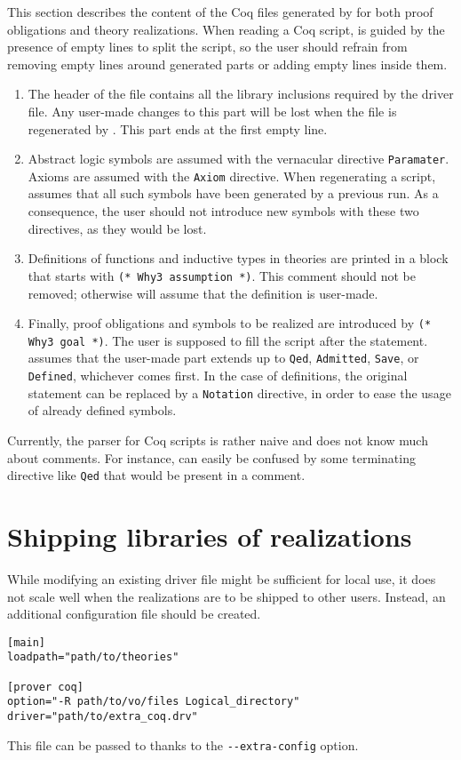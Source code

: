 This section describes the content of the Coq files generated by \why for
both proof obligations and theory realizations. When reading a Coq
script, \why is guided by the presence of empty lines to split the
script, so the user should refrain from removing empty lines around
generated parts or adding empty lines inside them.

\begin{enumerate}
\item	The header of the file contains all the library inclusions
	required by the driver file. Any user-made changes to this part
	will be lost when the file is regenerated by \why. This part ends
	at the first empty line.
\item	Abstract logic symbols are assumed with the vernacular directive
	\verb+Paramater+. Axioms are assumed with the \verb+Axiom+
	directive. When regenerating a script, \why assumes that all such
	symbols have been generated by a previous run. As a consequence,
	the user should not introduce new symbols with these two
	directives, as they would be lost.
\item	Definitions of functions and inductive types in theories are
	printed in a block that starts with \verb+(* Why3 assumption *)+.
	This comment should not be removed; otherwise \why will assume
	that the definition is user-made.
\item	Finally, proof obligations and symbols to be realized are
	introduced by \verb+(* Why3 goal *)+. The user is supposed to
	fill the script after the statement. \why assumes that the
	user-made part extends up to \verb+Qed+, \verb+Admitted+,
	\verb+Save+, or \verb+Defined+, whichever comes first. In the
	case of definitions, the original statement can be replaced by
	a \verb+Notation+ directive, in order to ease the usage of
	already defined symbols.
\end{enumerate}

Currently, the parser for Coq scripts is rather naive and does not know
much about comments. For instance, \why can easily be confused by
some terminating directive like \verb+Qed+ that would be present in a
comment.

\section{Shipping libraries of realizations}

While modifying an existing driver file might be sufficient for local
use, it does not scale well when the realizations are to be shipped to
other users. Instead, an additional configuration file should be created.

\begin{verbatim}
[main]
loadpath="path/to/theories"

[prover coq]
option="-R path/to/vo/files Logical_directory"
driver="path/to/extra_coq.drv"
\end{verbatim}

This file can be passed to \why thanks to the \verb+--extra-config+
option.
